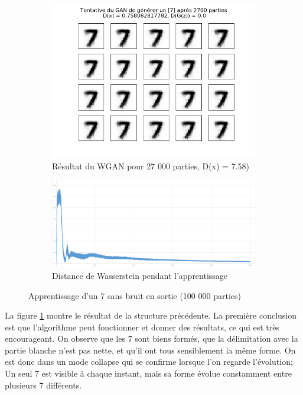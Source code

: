  	\begin{figure}[ht!]
  \centering
  	\begin{subfigure}[b]{.3\linewidth}
    \includegraphics[width=\linewidth]{fig/Wgan_result_1}
    \caption{Résultat du WGAN pour 27 000 parties, D(x) = 7.58)}
    \label{fig:Wgan_result_1_nombres}
\end{subfigure}
\quad
\begin{subfigure}[b]{.6\linewidth}
  \centering
    \includegraphics[width=10cm]{fig/Wgan_result_1_courbe}
    \caption{Distance de Wasserstein pendant l'apprentissage}
    \label{fig:Wgan_result_1_courbe}
    \end{subfigure}
    \caption{Apprentissage d'un 7 sans bruit en sortie (100 000 parties)}
    \label{fig:Wgan_result_1}
\end{figure}
	La figure \ref{fig:Wgan_result_1_nombres} montre le résultat de la structure précédente. La première conclusion est que l'algorithme peut fonctionner et donner des résultats, ce qui est très encourageant. On observe que les 7 sont biens formés, que la délimitation avec la partie blanche n'est pas nette, et qu'il ont tous sensiblement la même forme. On est donc dans un mode collapse qui se confirme lorsque l'on regarde l'évolution; Un seul 7 est visible à chaque instant, mais sa forme évolue constamment entre plusieurs 7 différents.\\
